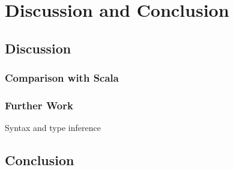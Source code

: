 
\part{Discussion and Conclusion}
\chapter{Discussion}
\section{Comparison with Scala}

\section{Further Work}
Syntax and type inference



\chapter{Conclusion}
